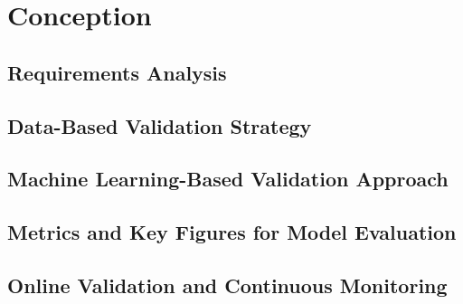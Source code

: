 \chapter{Conception}
\label{chap:methodology}

\section{Requirements Analysis}

\section{Data-Based Validation Strategy}

\section{Machine Learning-Based Validation Approach}

\section{Metrics and Key Figures for Model Evaluation}

\section{Online Validation and Continuous Monitoring}
